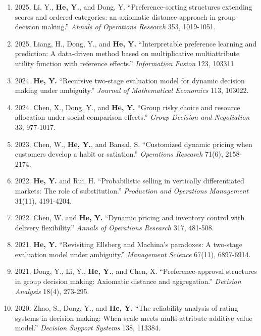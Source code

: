 \documentclass[10pt,a4paper]{article}
\begin{document}
\begin{enumerate}
\item 2025. Li, Y., \textbf{He, Y.}, and Dong, Y. “Preference-sorting structures extending scores and ordered categories: an axiomatic distance approach in group decision making.” \textit{Annals of Operations Research} 353, 1019-1051.
\item 2025. Liang, H., Dong, Y., and \textbf{He, Y.} “Interpretable preference learning and prediction: A data-driven method based on multiplicative multiattribute utility function with reference effects.” \textit{Information Fusion} 123, 103311.
\item 2024. \textbf{He, Y.} “Recursive two-stage evaluation model for dynamic decision making under ambiguity.” \textit{Journal of Mathematical Economics} 113, 103022.
\item 2024. Chen, X., Dong, Y., and \textbf{He, Y.} “Group risky choice and resource allocation under social comparison effects.” \textit{Group Decision and Negotiation} 33, 977-1017.
\item 2023. Chen, W., \textbf{He, Y.}, and Bansal, S. “Customized dynamic pricing when customers develop a habit or satiation.” \textit{Operations Research} 71(6), 2158-2174.
\item 2022. \textbf{He, Y.} and Rui, H. “Probabilistic selling in vertically differentiated markets: The role of substitution.” \textit{Production and Operations Management} 31(11), 4191-4204.
\item 2022. Chen, W. and \textbf{He, Y.} “Dynamic pricing and inventory control with delivery flexibility.” \textit{Annals of Operations Research} 317, 481-508.
\item 2021. \textbf{He, Y.} “Revisiting Ellsberg and Machina’s paradoxes: A two-stage evaluation model under ambiguity.” \textit{Management Science} 67(11), 6897-6914.
\item 2021. Dong, Y., Li, Y., \textbf{He, Y.}, and Chen, X. “Preference-approval structures in group decision making: Axiomatic distance and aggregation.” \textit{Decision Analysis} 18(4), 273-295.
\item 2020. Zhao, S., Dong, Y., and \textbf{He, Y.} “The reliability analysis of rating systems in decision making: When scale meets multi-attribute additive value model.” \textit{Decision Support Systems} 138, 113384.

\end{enumerate}
\end{document}
